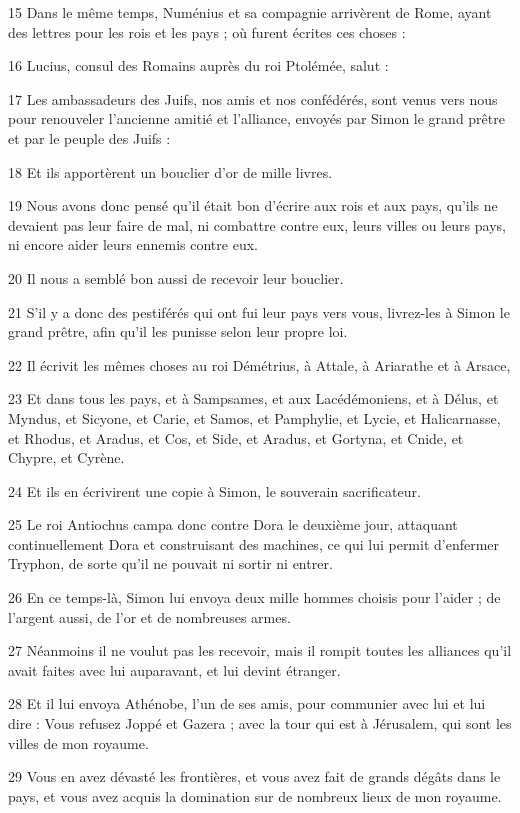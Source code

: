 \par 15 Dans le même temps, Numénius et sa compagnie arrivèrent de Rome, ayant des lettres pour les rois et les pays ; où furent écrites ces choses :
\par 16 Lucius, consul des Romains auprès du roi Ptolémée, salut :
\par 17 Les ambassadeurs des Juifs, nos amis et nos confédérés, sont venus vers nous pour renouveler l'ancienne amitié et l'alliance, envoyés par Simon le grand prêtre et par le peuple des Juifs :
\par 18 Et ils apportèrent un bouclier d'or de mille livres.
\par 19 Nous avons donc pensé qu'il était bon d'écrire aux rois et aux pays, qu'ils ne devaient pas leur faire de mal, ni combattre contre eux, leurs villes ou leurs pays, ni encore aider leurs ennemis contre eux.
\par 20 Il nous a semblé bon aussi de recevoir leur bouclier.
\par 21 S'il y a donc des pestiférés qui ont fui leur pays vers vous, livrez-les à Simon le grand prêtre, afin qu'il les punisse selon leur propre loi.
\par 22 Il écrivit les mêmes choses au roi Démétrius, à Attale, à Ariarathe et à Arsace,
\par 23 Et dans tous les pays, et à Sampsames, et aux Lacédémoniens, et à Délus, et Myndus, et Sicyone, et Carie, et Samos, et Pamphylie, et Lycie, et Halicarnasse, et Rhodus, et Aradus, et Cos, et Side, et Aradus, et Gortyna, et Cnide, et Chypre, et Cyrène.
\par 24 Et ils en écrivirent une copie à Simon, le souverain sacrificateur.
\par 25 Le roi Antiochus campa donc contre Dora le deuxième jour, attaquant continuellement Dora et construisant des machines, ce qui lui permit d'enfermer Tryphon, de sorte qu'il ne pouvait ni sortir ni entrer.
\par 26 En ce temps-là, Simon lui envoya deux mille hommes choisis pour l'aider ; de l'argent aussi, de l'or et de nombreuses armes.
\par 27 Néanmoins il ne voulut pas les recevoir, mais il rompit toutes les alliances qu'il avait faites avec lui auparavant, et lui devint étranger.
\par 28 Et il lui envoya Athénobe, l'un de ses amis, pour communier avec lui et lui dire : Vous refusez Joppé et Gazera ; avec la tour qui est à Jérusalem, qui sont les villes de mon royaume.
\par 29 Vous en avez dévasté les frontières, et vous avez fait de grands dégâts dans le pays, et vous avez acquis la domination sur de nombreux lieux de mon royaume.
